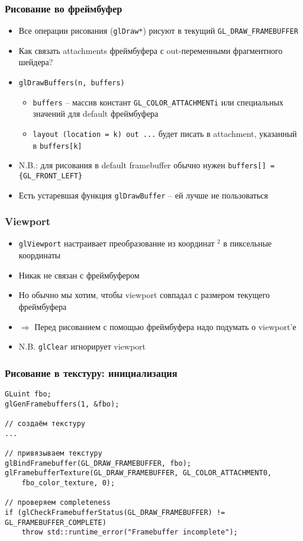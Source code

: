 \documentclass{beamer}
\begin{document}
\begin{frame}[fragile]
\frametitle{Рисование во фреймбуфер}
\begin{itemize}
\item Все операции рисования (\verb|glDraw*|) рисуют в текущий \verb|GL_DRAW_FRAMEBUFFER|
\pause
\item Как связать attachments фреймбуфера с out-переменными фрагментного шейдера?
\pause
\item \verb|glDrawBuffers(n, buffers)|
\begin{itemize}
\item \verb|buffers| -- массив констант \verb|GL_COLOR_ATTACHMENTi| или специальных значений для default фреймбуфера
\item \verb|layout (location = k) out ...| будет писать в attachment, указанный в \verb|buffers[k]|
\end{itemize}
\pause
\item N.B.: для рисования в default framebuffer обычно нужен \verb|buffers[] = {GL_FRONT_LEFT}|
\pause
\item Есть устаревшая функция \verb|glDrawBuffer| -- ей лучше не пользоваться
\end{itemize}
\end{frame}

\begin{frame}[fragile]
\frametitle{Viewport}
\begin{itemize}
\item \verb|glViewport| настраивает преобразование из координат \begin{math}[-1, 1]^2\end{math} в пиксельные координаты
\pause
\item Никак не связан с фреймбуфером
\pause
\item Но обычно мы хотим, чтобы viewport совпадал с размером текущего фреймбуфера
\pause
\item \begin{math}\Rightarrow\end{math} Перед рисованием с помощью фреймбуфера надо подумать о viewport'е
\pause
\item N.B. \verb|glClear| игнорирует viewport
\end{itemize}
\end{frame}

\begin{frame}[fragile]
\frametitle{Рисование в текстуру: инициализация}
\fontsize{8pt}{8pt}
\begin{verbatim}
GLuint fbo;
glGenFramebuffers(1, &fbo);

// создаём текстуру
...

// привязываем текстуру
glBindFramebuffer(GL_DRAW_FRAMEBUFFER, fbo);
glFramebufferTexture(GL_DRAW_FRAMEBUFFER, GL_COLOR_ATTACHMENT0,
    fbo_color_texture, 0);

// проверяем completeness
if (glCheckFramebufferStatus(GL_DRAW_FRAMEBUFFER) != GL_FRAMEBUFFER_COMPLETE)
    throw std::runtime_error("Framebuffer incomplete");
\end{verbatim}
\end{frame}
\end{document}
